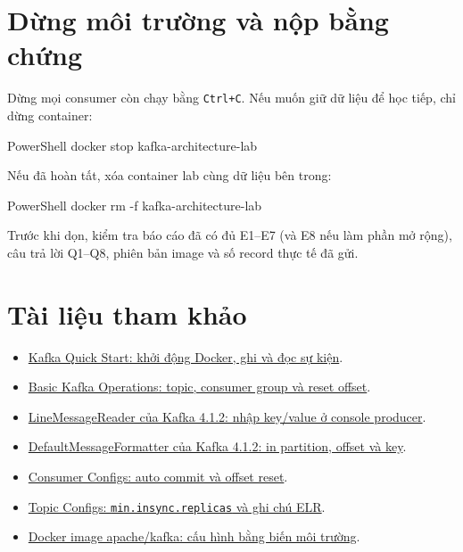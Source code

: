 \section{Dừng môi trường và nộp bằng chứng}

Dừng mọi consumer còn chạy bằng \texttt{Ctrl+C}. Nếu muốn giữ dữ liệu để học tiếp, chỉ dừng container:


\begin{aivncodebox}[language={}]{PowerShell}
docker stop kafka-architecture-lab
\end{aivncodebox}

Nếu đã hoàn tất, xóa container lab cùng dữ liệu bên trong:


\begin{aivncodebox}[language={}]{PowerShell}
docker rm -f kafka-architecture-lab
\end{aivncodebox}

Trước khi dọn, kiểm tra báo cáo đã có đủ E1--E7 (và E8 nếu làm phần mở rộng), câu trả lời Q1--Q8, phiên bản image và số record thực tế đã gửi.


\section*{Tài liệu tham khảo}

\begin{itemize}
\item \href{https://kafka.apache.org/41/getting-started/quickstart/}{Kafka Quick Start: khởi động Docker, ghi và đọc sự kiện}.
\item \href{https://kafka.apache.org/41/operations/basic-kafka-operations/}{Basic Kafka Operations: topic, consumer group và reset offset}.
\item \href{https://github.com/apache/kafka/blob/4.1.2/tools/src/main/java/org/apache/kafka/tools/LineMessageReader.java}{LineMessageReader của Kafka 4.1.2: nhập key/value ở console producer}.
\item \href{https://github.com/apache/kafka/blob/4.1.2/tools/src/main/java/org/apache/kafka/tools/consumer/DefaultMessageFormatter.java}{DefaultMessageFormatter của Kafka 4.1.2: in partition, offset và key}.
\item \href{https://kafka.apache.org/41/configuration/consumer-configs/}{Consumer Configs: auto commit và offset reset}.
\item \href{https://kafka.apache.org/41/configuration/topic-configs/}{Topic Configs: \texttt{min.\allowbreak{}insync.\allowbreak{}replicas} và ghi chú ELR}.
\item \href{https://github.com/apache/kafka/blob/4.1.2/docker/examples/README.md}{Docker image apache/kafka: cấu hình bằng biến môi trường}.
\end{itemize}
